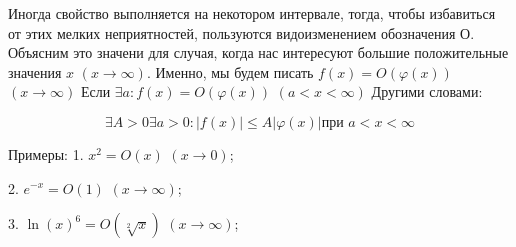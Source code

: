 \documentclass{report}
\begin{document}
Иногда свойство выполняется на некотором интервале, тогда, чтобы избавиться от этих мелких неприятностей, пользуются видоизменением обозначения О.
Объясним это значени для случая, когда нас интересуют большие положительные значения $x$ $(x\to\infty)$. Именно, мы будем писать $f(x)=O(\varphi(x))$   $(x\to\infty)$
Если $\exists{a}:f(x)=O(\varphi(x))$    $(a<x<\infty)$
Другими словами:
\begin{center}
\[\exists A>0 \exists a>0: |f(x)| \leq A|\varphi(x)| \textrm{при $a<x<\infty$}\]
\end{center}
Примеры:
1. $x^{2}=O(x)$     $(x\to0)$;
\begin{center}
\end{center}
2. $e^{-x}=O(1)$     $(x\to\infty)$;
\begin{center}
\end{center}   
3. ${\ln(x)}^{6}=O(\sqrt[2]{x})$     $(x\to\infty)$;
\begin{center}
\end{center}   
\end{document}
